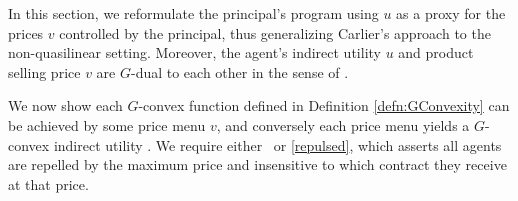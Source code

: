 In this section,
we reformulate the 
principal's program using $u$ as a proxy for the prices $v$ controlled
by the principal,  thus generalizing Carlier's approach \cite{Carlier01} to the non-quasilinear setting. Moreover, the agent's indirect utility $u$ and product selling price $v$ are $G$-dual to each other in the sense of \cite{Trudinger14}.\medskip

%	
	

		
		
%			
%			

%			
			
					
	We now show each $G$-convex function defined in Definition \ref{defn:GConvexity} can be achieved by 
	some price menu $v$,  and conversely each price menu yields a $G$-convex indirect utility \cite{Trudinger14}.
	We require either \Gfive\ or \eqref{repulsed}, which asserts
	all agents are repelled by the maximum price and insensitive to which contract they receive at that price.\medskip
					
